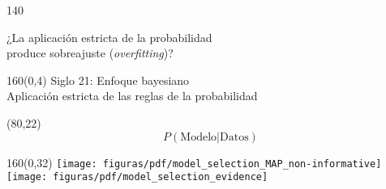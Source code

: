 \documentclass[shownotes,aspectratio=169]{beamer}
\begin{document}
\begin{frame}[plain]
{\begin{textblock}{140}

\end{textblock}
}







\end{frame}



\begin{frame}[plain]

\centering
\LARGE

¿La aplicación estricta de la probabilidad  \\

produce sobreajuste (\textit{overfitting})?


\end{frame}



\begin{frame}[plain]
\begin{textblock}{160}(0,4)
\centering  \LARGE Siglo 21: Enfoque bayesiano \\
\large Aplicación estricta de las reglas de la probabilidad
\end{textblock}

\begin{textblock}{80}(80,22)\Large
\begin{equation*}
P(\text{Modelo}|\text{Datos})
\end{equation*}
\end{textblock}


\begin{textblock}{160}(0,32)
     \centering
       \texttt{[image: figuras/pdf/model\_selection\_MAP\_non-informative]}
       \texttt{[image: figuras/pdf/model\_selection\_evidence]}
\end{textblock}

\end{frame}
\end{document}
